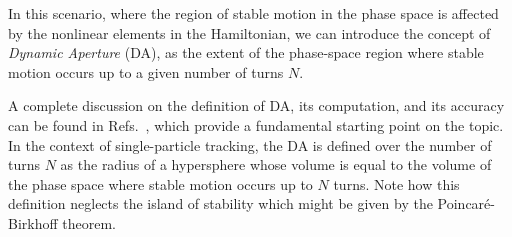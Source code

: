 In this scenario, where the region of stable motion in the phase space is affected by the nonlinear elements in the Hamiltonian, we can introduce the concept of \textit{Dynamic Aperture} (DA), as the extent of the phase-space region where stable motion occurs up to a given number of turns $N$.

A complete discussion on the definition of DA, its computation, and its accuracy can be found in Refs.~\cite{PhysRevE.53.4067, invlog}, which provide a fundamental starting point on the topic. In the context of single-particle tracking, the DA is defined over the number of turns $N$ as the radius of a hypersphere whose volume is equal to the volume of the phase space where stable motion occurs up to $N$ turns. Note how this definition neglects the island of stability which might be given by the Poincaré-Birkhoff theorem.

